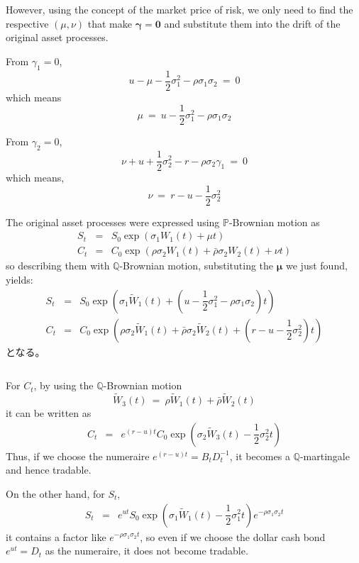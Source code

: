 \documentclass[uplatex,a4j,12pt,dvipdfmx]{jsarticle}
\begin{document}
However, using the concept of the market price of risk, we only need to find the respective $(\mu,\nu)$ that make ${\bm \gamma} = {\bm 0}$ and substitute them into the drift of the original asset processes.

From $\gamma_{1} = 0$,
$$
	u
	-
	\mu - \dfrac{1}{2} \sigma_{1}^{2} - \rho \sigma_{1} \sigma_{2}
	\ = \ 0
$$
which means
$$
	\mu
	\ = \
	u - \dfrac{1}{2} \sigma_{1}^{2} - \rho \sigma_{1} \sigma_{2}
$$

From $\gamma_{2} = 0$,
$$
	\nu + u + \dfrac{1}{2} \sigma_{2}^{2} - r - \rho \sigma_{2} \gamma_{1}
	\ = \
	0
$$
which means,
$$
	\nu
	\ = \
	r - u - \dfrac{1}{2} \sigma_{2}^{2}
$$

The original asset processes were expressed using $\mathbb{P}$-Brownian motion as
%
%
\begin{eqnarray*}
	S_{t}
	&=&
	S_{0}
	\exp \left( \sigma_{1} W_{1}(t) + \mu t \right)
	\\
	C_{t}
	&=&
	C_{0}
	\exp \left(
	\rho \sigma_{2} W_{1}(t) +
	\bar{\rho} \sigma_{2} W_{2}(t) + \nu t \right)
\end{eqnarray*}
%
%
so describing them with $\mathbb{Q}$-Brownian motion, substituting the ${\bm \mu}$ we just found, yields:
%
%
\begin{eqnarray*}
	S_{t}
	&=&
	S_{0}
	\exp \left( \sigma_{1} \tilde{W}_{1}(t) +
	\left(
		u - \dfrac{1}{2} \sigma_{1}^{2} - \rho \sigma_{1} \sigma_{2}
		\right)
	t \right)
	\\
	C_{t}
	&=&
	C_{0}
	\exp \left(
	\rho \sigma_{2} \tilde{W}_{1}(t) +
	\bar{\rho} \sigma_{2} \tilde{W}_{2}(t) +
	\left(
		r - u - \dfrac{1}{2} \sigma_{2}^{2}
		\right)
	t \right)
\end{eqnarray*}
%
%
となる。

${}$

For $C_{t}$, by using the $\mathbb{Q}$-Brownian motion
$$
	\tilde{W}_{3}(t)
	\ = \
	\rho \tilde{W}_{1}(t) +
	\bar{\rho} \tilde{W}_{2}(t)
$$
it can be written as
%
%
\begin{eqnarray*}
	C_{t}
	&=&
	e^{(r-u)t}
	C_{0}
	\exp \left(
	\sigma_{2} \tilde{W}_{3}(t) -
	\dfrac{1}{2} \sigma_{2}^{2}
	t \right)
\end{eqnarray*}
%
%
Thus, if we choose the numeraire $e^{(r-u)t} = B_{t} D^{-1}_{t}$, it becomes a $\mathbb{Q}$-martingale and hence tradable.

On the other hand, for $S_t$,
%
%
\begin{eqnarray*}
	S_{t}
	&=&
	e^{ut}
	S_{0}
	\exp \left( \sigma_{1} \tilde{W}_{1}(t) -
	\dfrac{1}{2} \sigma_{1}^{2}
	t \right)
	e^{- \rho \sigma_{1} \sigma_{2} t}
\end{eqnarray*}
%
%
it contains a factor like $e^{- \rho \sigma_{1} \sigma_{2} t}$, so even if we choose the dollar cash bond $e^{ut} = D_{t}$ as the numeraire, it does not become tradable.
\end{document}
